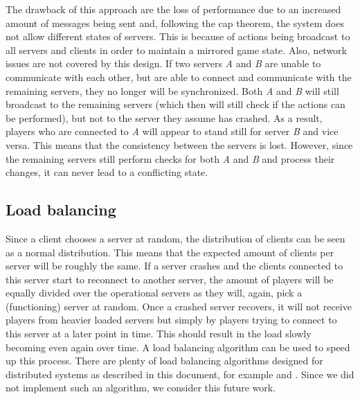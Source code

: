 		The drawback of this approach are the loss of performance due to an increased amount of messages being sent and, following the cap theorem, the system does not allow different states of servers. 
		This is because of actions being broadcast to all servers and clients in order to maintain a mirrored game state. 
		Also, network issues are not covered by this design. 
		If two servers \emph{A} and \emph{B} are unable to communicate with each other, but are able to connect and communicate with the remaining servers, they no longer will be synchronized. 
		Both \emph{A} and \emph{B} will still broadcast to the remaining servers (which then will still check if the actions can be performed), but not to the server they assume has crashed. 
		As a result, players who are connected to \emph{A} will appear to stand still for server \emph{B} and vice versa. 
		This means that the consistency between the servers is lost. 
		However, since the remaining servers still perform checks for both \emph{A} and \emph{B} and process their changes, it can never lead to a conflicting state.
	
	\subsection{Load balancing}
	\label{subsec:load_balancing}
		Since a client chooses a server at random, the distribution of clients can be seen as a normal distribution. 
		This means that the expected amount of clients per server will be roughly the same.
		If a server crashes and the clients connected to this server start to reconnect to another server, the amount of players will be equally divided over the operational servers as they will, again, pick a (functioning) server at random.
		Once a crashed server recovers, it will not receive players from heavier loaded servers but simply by players trying to connect to this server at a later point in time. 
		This should result in the load slowly becoming even again over time. 
		A load balancing algorithm can be used to speed up this process.
		There are plenty of load balancing algorithms designed for distributed systems as described in this document, for example \cite{wolff2001dynamic} and \cite{ballard2000client}. Since we did not implement such an algorithm, we consider this future work.
		
